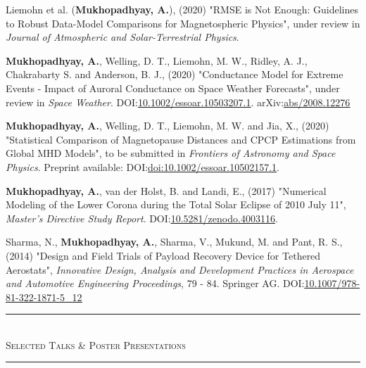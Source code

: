 \documentclass[10pt]{article}
\begin{document}
{{Liemohn et al. (\textbf{Mukhopadhyay, A.}), (2020) "RMSE is Not Enough: Guidelines to Robust Data-Model Comparisons for Magnetospheric Physics", under review in \textit{Journal of Atmospheric and Solar-Terrestrial Physics}. \vspace{0.5em}

\textbf{Mukhopadhyay, A.}, Welling, D. T., Liemohn, M. W., Ridley, A. J., Chakrabarty S. and Anderson, B. J., (2020) "Conductance Model for Extreme Events - Impact of Auroral Conductance on Space Weather Forecasts", under review in \textit{Space Weather}. DOI:\href{https://doi.org/10.1002/essoar.10503207.1}{\underline{10.1002/essoar.10503207.1}}. arXiv:\href{https://arxiv.org/abs/2008.12276}{\underline{abs/2008.12276}}\vspace{0.5em}

\textbf{Mukhopadhyay, A.}, Welling, D. T., Liemohn, M. W. and Jia, X., (2020) "Statistical Comparison of Magnetopause Distances and CPCP Estimations from Global MHD Models", to be submitted in \textit{Frontiers of Astronomy and Space Physics}. Preprint available: DOI:\href{https://doi.org/10.1002/essoar.10502157.1}{\underline{doi:10.1002/essoar.10502157.1}}.\vspace{0.5em}

\textbf{Mukhopadhyay, A.}, van der Holst, B. and Landi, E., (2017) "Numerical Modeling of the Lower Corona during the Total Solar Eclipse of 2010 July 11", \textit{Master's Directive Study Report}. DOI:\href{https://doi.org/10.5281/zenodo.4003116}{\underline{10.5281/zenodo.4003116}}.\vspace{0.5em}

Sharma, N., \textbf{Mukhopadhyay, A.}, Sharma, V., Mukund, M. and Pant, R. S., (2014) "Design and Field Trials of Payload Recovery Device for Tethered Aerostats", \textit{Innovative Design, Analysis and Development Practices in Aerospace and Automotive Engineering Proceedings}, 79 - 84. Springer AG. DOI:\href{https://doi.org/10.1007/978-81-322-1871-5_12}{\underline{10.1007/978-81-322-1871-5\_12}}\vspace{0.5em}

\vspace{-0.5em}
\begin{center}
{\noindent\rule[0.5ex]{\linewidth}{0.5pt}\\
\vspace{-0.5em}\large{\textsc{Selected Talks \& Poster %
Presentations}}\\
\vspace{-0.25em}
\noindent\rule[0.5ex]{\linewidth}{0.5pt}}\\
\vspace{-0.5em}
\end{center}

}}
\end{document}
